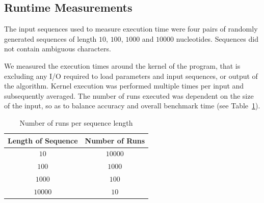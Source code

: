 \documentclass[runningheads,a4paper]{llncs}
\begin{document}
\subsection{Runtime Measurements}

The input sequences used to measure execution time were four pairs of randomly generated sequences of length $10$, $100$, $1000$ and $10000$ nucleotides. Sequences did not contain ambiguous characters. 

We measured the execution times around the kernel of the program, that is excluding any I/O required to load parameters and input sequences, or output of the algorithm. Kernel execution was performed multiple times per input and subsequently averaged. The number of runs executed was dependent on the size of the input, so as to balance accuracy and overall benchmark time (see Table~\ref{fig:runs}). 

\begin{table}
\centering

\begin{tabular}{|c|c|}
\hline 
Length of Sequence & Number of Runs \\ 
\hline 
$10$ & $10000$ \\ 
\hline 
$100$ & $1000$ \\ 
\hline 
$1000$ & $100$ \\ 
\hline 
$10000$ & $10$ \\ 
\hline 
\end{tabular}
\caption{Number of runs per sequence length}
\label{fig:runs}
\end{table}
\end{document}
